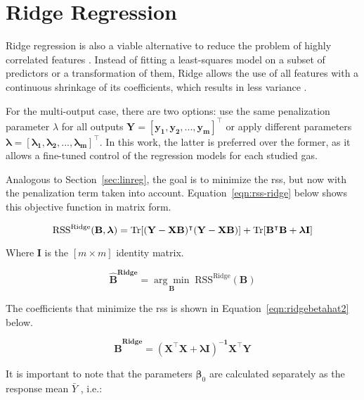 \section{Ridge Regression}
\label{sec:ridge}

Ridge regression is also a viable alternative to reduce the problem of highly correlated features \parencite{friedman2001}. Instead of fitting a least-squares model on a subset of predictors or a transformation of them, Ridge allows the use of all features with a continuous shrinkage of its coefficients, which results in less variance \parencite{friedman2001}.

For the multi-output case, there are two options: use the same penalization parameter $\lambda$ for all outputs $\mathbf{Y = [y_1, y_2, ... , y_m]^\intercal}$ or apply different parameters $\mathbf{\boldsymbol{\lambda} = [\lambda_1, \lambda_2, ... , \lambda_m]^\intercal}$. In this work, the latter is preferred over the former, as it allows a fine-tuned control of the regression models for each studied gas.

Analogous to Section~\ref{sec:linreg}, the goal is to minimize the \acrshort{rss}, but now with the penalization term taken into account. Equation~\ref{eqn:rss-ridge} below shows this objective function in matrix form.

\begin{equation} 
	\label{eqn:rss-ridge}
	\text{RSS}^{\text{Ridge}}(\mathbf{B, \boldsymbol{\lambda} }) = \operatorname{Tr} [\mathbf{(Y-XB)^\intercal (Y-XB)}] + \operatorname{Tr}[\mathbf{B^\intercal B + \boldsymbol{\lambda} I}]
\end{equation}

Where $\mathbf{I}$ is the $[m \times m]$ identity matrix.

\begin{equation}
	\label{eqn:ridgebetahat}
	\mathbf{\hat{B}^\text{Ridge}} = \underset{\mathbf{B}}{\arg\min} 	\; \text{RSS}^{\text{Ridge}}(\mathbf{B})
\end{equation}	

The coefficients that minimize the \acrshort{rss} is shown in Equation~\ref{eqn:ridgebetahat2} below.

\begin{equation}
	\label{eqn:ridgebetahat2}
	\mathbf{\hat{B}^\text{Ridge}} = \mathbf{(X^\intercal X + \boldsymbol{\lambda}  I )^{-1} X^\intercal Y}
\end{equation}

It is important to note that the parameters $\boldsymbol{\beta}_0$ are calculated separately as the response mean $\bar{Y}$ \parencite{friedman2001}, i.e.:

